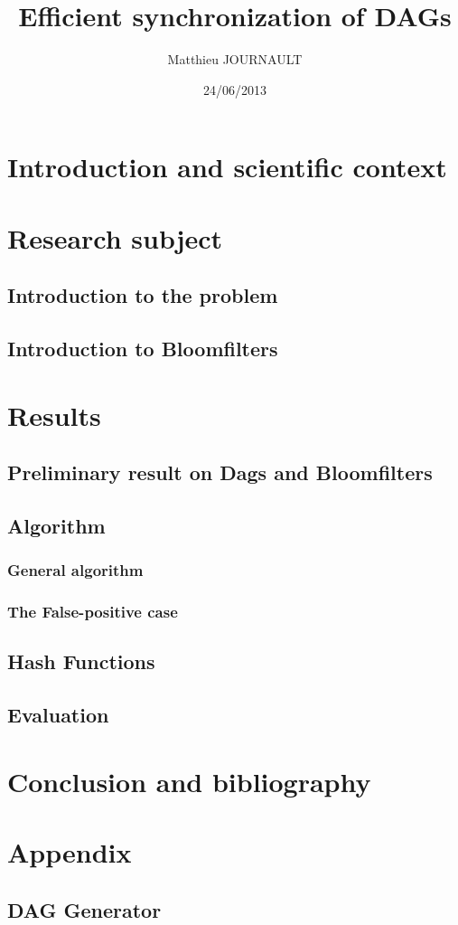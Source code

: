 \documentclass[a4paper,10pt]{report}
\title{Efficient synchronization of DAGs}
\author{Matthieu JOURNAULT}
\date{24/06/2013}
\theoremstyle{definition}
\theoremstyle{definition}
\begin{document}
\maketitle
\tableofcontents
% 
\chapter{Introduction and scientific context}
\chapter{Research subject}
\section{Introduction to the problem}

\section{Introduction to Bloomfilters}

\chapter{Results}
\section{Preliminary result on Dags and Bloomfilters}
\label{sec:prelim}

\section{Algorithm}
\subsection{General algorithm}

\subsection{The False-positive case}

\subsection{}
\section{Hash Functions}

\section{Evaluation}
\chapter{Conclusion and bibliography}
%   
\chapter{Appendix}
\section{DAG Generator}
\label{sec:daggen}

%   
\end{document}
